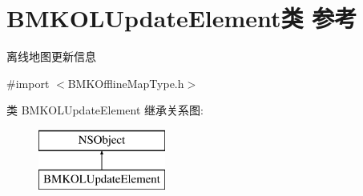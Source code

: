 \hypertarget{interface_b_m_k_o_l_update_element}{}\section{B\+M\+K\+O\+L\+Update\+Element类 参考}
\label{interface_b_m_k_o_l_update_element}


离线地图更新信息  




{\ttfamily \#import $<$B\+M\+K\+Offline\+Map\+Type.\+h$>$}

类 B\+M\+K\+O\+L\+Update\+Element 继承关系图\+:\begin{figure}[H]
\begin{center}
\leavevmode
\includegraphics[height=2.000000cm]{interface_b_m_k_o_l_update_element}
\end{center}
\end{figure}
